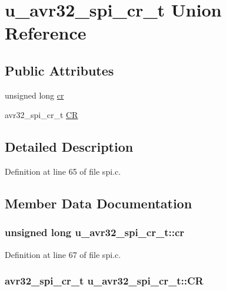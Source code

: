 \hypertarget{unionu__avr32__spi__cr__t}{}\section{u\+\_\+avr32\+\_\+spi\+\_\+cr\+\_\+t Union Reference}
\label{unionu__avr32__spi__cr__t}
\subsection*{Public Attributes}
\begin{DoxyCompactItemize}
\item 
unsigned long \hyperlink{unionu__avr32__spi__cr__t_a9a625d64d160e69baf044b8938e01468}{cr}
\item 
avr32\+\_\+spi\+\_\+cr\+\_\+t \hyperlink{unionu__avr32__spi__cr__t_afb4bf79a0ac649f1c5593215a4f0c452}{C\+R}
\end{DoxyCompactItemize}


\subsection{Detailed Description}


Definition at line 65 of file spi.\+c.



\subsection{Member Data Documentation}
\hypertarget{unionu__avr32__spi__cr__t_a9a625d64d160e69baf044b8938e01468}{}
\subsubsection[{cr}]{\setlength{\rightskip}{0pt plus 5cm}unsigned long u\+\_\+avr32\+\_\+spi\+\_\+cr\+\_\+t\+::cr}\label{unionu__avr32__spi__cr__t_a9a625d64d160e69baf044b8938e01468}


Definition at line 67 of file spi.\+c.

\hypertarget{unionu__avr32__spi__cr__t_afb4bf79a0ac649f1c5593215a4f0c452}{}
\subsubsection[{C\+R}]{\setlength{\rightskip}{0pt plus 5cm}avr32\+\_\+spi\+\_\+cr\+\_\+t u\+\_\+avr32\+\_\+spi\+\_\+cr\+\_\+t\+::\+C\+R}\label{unionu__avr32__spi__cr__t_afb4bf79a0ac649f1c5593215a4f0c452}


